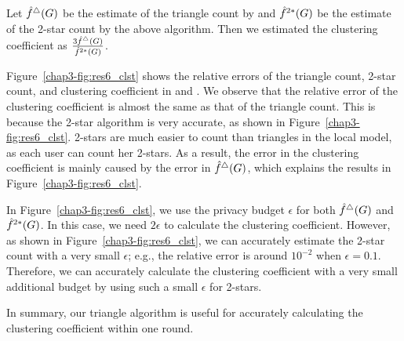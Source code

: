 Let $\hat{f}^\triangle(G)$ be the estimate of the triangle count by \AlgWSTriVR{} and $\hat{f}^{2*}(G)$ be the estimate of the 2-star count by the above algorithm.
Then we estimated the clustering coefficient as $\frac{3 \hat{f}^\triangle(G)}{\hat{f}^{2*}(G)}$.

Figure~\ref{chap3-fig:res6_clst} shows the relative errors of the triangle count, 2-star count, and clustering coefficient in \Gplus{} and \IMDB{}.
We observe that the relative error of the clustering coefficient is almost the same as that of the triangle count.
This is because the 2-star algorithm is very accurate, as shown in Figure~\ref{chap3-fig:res6_clst}.
2-stars are much easier to count than triangles in the local model, as each user can count her 2-stars.
As a result, the error in the clustering coefficient is mainly caused by the error in $\hat{f}^\triangle(G)$, which explains the results in Figure~\ref{chap3-fig:res6_clst}.

In Figure~\ref{chap3-fig:res6_clst}, we use the privacy budget $\epsilon$ for both $\hat{f}^\triangle(G)$ and $\hat{f}^{2*}(G)$.
In this case, we need $2\epsilon$ to calculate the clustering coefficient.
However, as shown in Figure~\ref{chap3-fig:res6_clst}, we can accurately estimate the 2-star count with a very small $\epsilon$; e.g., the relative error is around $10^{-2}$ when $\epsilon=0.1$.
Therefore, we can accurately calculate the clustering coefficient
with a very small additional budget
by using such a small $\epsilon$ for 2-stars.

In summary, our triangle algorithm \AlgWSTriVR{} is useful for accurately calculating the clustering coefficient within one round.

